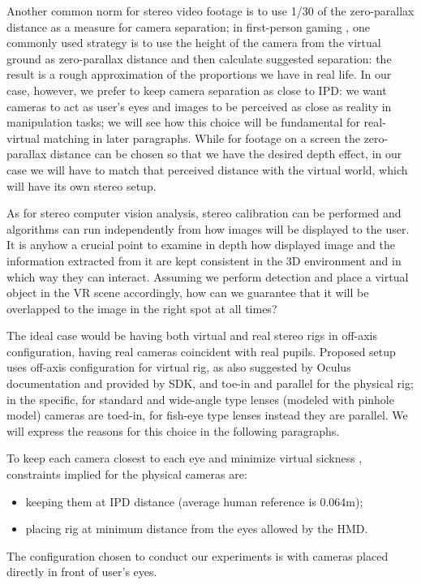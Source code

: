 Another common norm for stereo video footage is to use 1/30 of the zero-parallax distance as a measure for camera separation; in first-person gaming \cite{stereo_pairs_game}, one commonly used strategy is to use the height of the camera from the virtual ground as zero-parallax distance and then calculate suggested separation: the result is a rough approximation of the proportions we have in real life. In our case, however, we prefer to keep camera separation as close to IPD: we want cameras to act as user's eyes and images to be perceived as close as reality in manipulation tasks; we will see how this choice will be fundamental for real-virtual matching in later paragraphs. While for footage on a screen the zero-parallax distance can be chosen so that we have the desired depth effect, in our case we will have to match that perceived distance with the virtual world, which will have its own stereo setup.

As for stereo computer vision analysis, stereo calibration can be performed and algorithms can run independently from how images will be displayed to the user. It is anyhow a crucial point to examine in depth how displayed image and the information extracted from it are kept consistent in the 3D environment and in which way they can interact. Assuming we perform detection and place a virtual object in the VR scene accordingly, how can we guarantee that it will be overlapped to the image in the right spot at all times?

The ideal case would be having both virtual and real stereo rigs in off-axis configuration, having real cameras coincident with real pupils. Proposed setup uses off-axis configuration for virtual rig, as also suggested by Oculus documentation and provided by SDK, and toe-in and parallel for the physical rig; in the specific, for standard and wide-angle type lenses (modeled with pinhole model) cameras are toed-in, for fish-eye type lenses instead they are parallel. We will express the reasons for this choice in the following paragraphs.

To keep each camera closest to each eye and minimize virtual sickness \cite{optical_vs_video_st}, constraints implied for the physical cameras are:
\begin{itemize}
\item keeping them at IPD distance (average human reference is 0.064m);
\item placing rig at minimum distance from the eyes allowed by the HMD.
\end{itemize}
The configuration chosen to conduct our experiments is with cameras placed directly in front of user's eyes.

